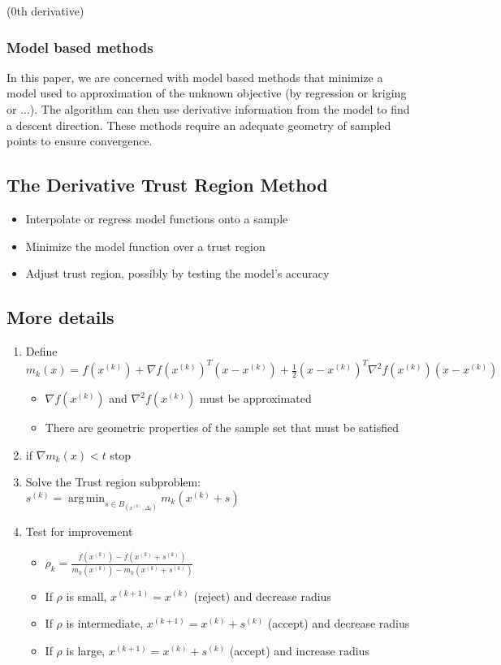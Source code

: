 \documentclass{article}
\DeclareMathOperator*{\argmin}{arg\,min}
\begin{document}
(0th derivative)

\subsubsection{Model based methods}
In this paper, we are concerned with model based methods that minimize a model used to approximation of the unknown objective (by regression or kriging or ...).
The algorithm can then use derivative information from the model to find a descent direction.
These methods require an adequate geometry of sampled points to ensure convergence.






\subsection{The Derivative Trust Region Method}

\begin{itemize}
	\item Interpolate or regress model functions onto a sample
	\item Minimize the model function over a trust region
	\item Adjust trust region, possibly by testing the model's accuracy
\end{itemize}




\subsection{More details}

\begin{enumerate}
	\item Define $m_k(x) = f(x^{(k)}) + \nabla f(x^{(k)})^T (x-x^{(k)}) + \frac 1 2 (x-x^{(k)})^T\nabla^2f(x^{(k)})(x-x^{(k)})$
	\begin{itemize}
		\item $\nabla f(x^{(k)})$ and $\nabla^2 f(x^{(k)})$ must be approximated
		\item There are geometric properties of the sample set that must be satisfied
	\end{itemize}
	\item if $\nabla m_k(x) < t$ stop
	\item Solve the Trust region subproblem: $s^{(k)} = \argmin_{s\in B_(x^{(k)}, \Delta_k)} m_k(x^{(k)} + s)$
	\item Test for improvement
	\begin{itemize}
		\item $\rho_k = \frac{f(x^{(k)}) - f(x^{(k)}+s^{(k)})}{m_k(x^{(k)}) - m_k(x^{(k)}+s^{(k)})}$
		\item If $\rho$ is small, $x^{(k+1)}=x^{(k)}$ (reject) and decrease radius
		\item If $\rho$ is intermediate, $x^{(k+1)}=x^{(k)}+s^{(k)}$ (accept) and decrease radius
		\item If $\rho$ is large, $x^{(k+1)}=x^{(k)}+s^{(k)}$ (accept) and increase radius
	\end{itemize}
\end{enumerate}
\end{document}
